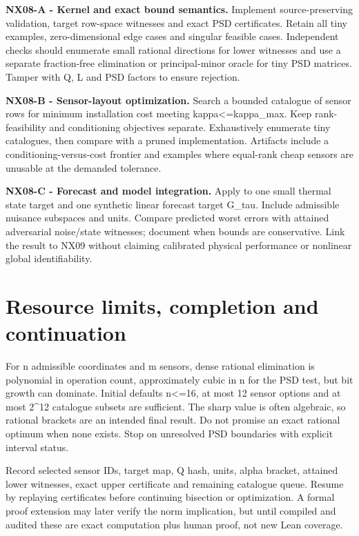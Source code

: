 \documentclass[
  11pt,
  a4paper,
]{report}
\begin{document}
\textbf{NX08-A - Kernel and exact bound semantics.} Implement
source-preserving validation, target row-space witnesses and exact PSD
certificates. Retain all tiny examples, zero-dimensional edge cases and
singular feasible cases. Independent checks should enumerate small
rational directions for lower witnesses and use a separate fraction-free
elimination or principal-minor oracle for tiny PSD matrices. Tamper with
Q, L and PSD factors to ensure rejection.

\textbf{NX08-B - Sensor-layout optimization.} Search a bounded catalogue
of sensor rows for minimum installation cost meeting
kappa\textless=kappa\_max. Keep rank-feasibility and conditioning
objectives separate. Exhaustively enumerate tiny catalogues, then
compare with a pruned implementation. Artifacts include a
conditioning-versus-cost frontier and examples where equal-rank cheap
sensors are unusable at the demanded tolerance.

\textbf{NX08-C - Forecast and model integration.} Apply to one small
thermal state target and one synthetic linear forecast target G\_tau.
Include admissible nuisance subspaces and units. Compare predicted worst
errors with attained adversarial noise/state witnesses; document when
bounds are conservative. Link the result to NX09 without claiming
calibrated physical performance or nonlinear global identifiability.

\hypertarget{resource-limits-completion-and-continuation}{%
\section{Resource limits, completion and
continuation}\label{resource-limits-completion-and-continuation}}

For n admissible coordinates and m sensors, dense rational elimination
is polynomial in operation count, approximately cubic in n for the PSD
test, but bit growth can dominate. Initial defaults n\textless=16, at
most 12 sensor options and at most 2\^{}12 catalogue subsets are
sufficient. The sharp value is often algebraic, so rational brackets are
an intended final result. Do not promise an exact rational optimum when
none exists. Stop on unresolved PSD boundaries with explicit interval
status.

Record selected sensor IDs, target map, Q hash, units, alpha bracket,
attained lower witnesses, exact upper certificate and remaining
catalogue queue. Resume by replaying certificates before continuing
bisection or optimization. A formal proof extension may later verify the
norm implication, but until compiled and audited these are exact
computation plus human proof, not new Lean coverage.
\end{document}
